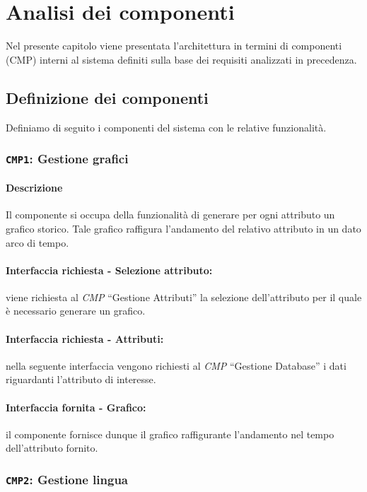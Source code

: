 \chapter{Analisi dei componenti}
    Nel presente capitolo viene presentata l'architettura in termini di componenti (CMP) interni al sistema definiti sulla base dei requisiti analizzati in precedenza.

\section{Definizione dei componenti}
    Definiamo di seguito i componenti del sistema con le relative funzionalità.
    
    \subsection{\texttt{CMP1}: Gestione grafici}
        \subsubsection{Descrizione} 
            Il componente si occupa della funzionalità di generare per ogni attributo un grafico storico. Tale grafico raffigura l'andamento del relativo attributo in un dato arco di tempo.
        \subsubsection{Interfaccia richiesta - Selezione attributo:}
            viene richiesta al \textit{CMP} ``Gestione Attributi'' la selezione dell'attributo per il quale è necessario generare un grafico.
        \subsubsection{Interfaccia richiesta - Attributi:}
            nella seguente interfaccia vengono richiesti al \textit{CMP} ``Gestione Database'' i dati riguardanti l'attributo di interesse.
        \subsubsection{Interfaccia fornita - Grafico:}
            il componente fornisce dunque il grafico raffigurante l'andamento nel tempo dell'attributo fornito.
    
    \subsection{\texttt{CMP2}: Gestione lingua}
